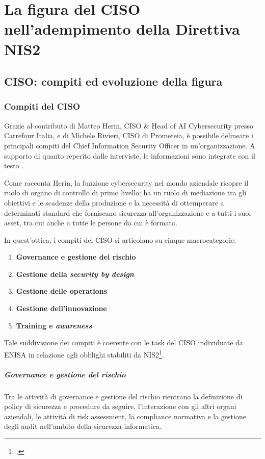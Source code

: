 \chapter{La figura del CISO nell'adempimento della Direttiva NIS2}
\label{cap:ciso}

\section{CISO: compiti ed evoluzione della figura}

\subsection{Compiti del CISO}
Grazie al contributo di Matteo Herin, CISO \& Head of AI Cybersecurity presso Carrefour
Italia, e di Michele Rivieri, CISO di Prometeia, è possibile delineare i principali 
compiti del Chief Information Security Officer in un'organizzazione. A supporto di quanto
reperito dalle interviste, le informazioni sono integrate con il testo \cite{kouns-ciso}.

Come racconta Herin, la funzione cybersecurity nel mondo aziendale ricopre il ruolo
di organo di controllo di primo livello: ha un ruolo di mediazione tra gli obiettivi e 
le scadenze della produzione e la necessità di ottemperare a determinati standard che forniscano
sicurezza all'organizzazione e a tutti i suoi asset, tra cui anche a tutte le persone da
cui è formata.

In quest'ottica, i compiti del CISO si articolano su cinque macrocategorie:
\begin{enumerate}
    \item \textbf{Governance e gestione del rischio}
    \item \textbf{Gestione della \textit{security by design}}
    \item \textbf{Gestione delle operations}
    \item \textbf{Gestione dell'innovazione}
    \item \textbf{Training e \textit{awareness}}
\end{enumerate}
Tale suddivisione dei compiti è coerente con le task del CISO individuate da ENISA in relazione
agli obblighi stabiliti da NIS2\footcite[p. 23]{enisa-cybersecurity-roles}.

\paragraph{Governance e gestione del rischio}
Tra le attività di governance e gestione del rischio rientrano la definizione di
policy di sicurezza e procedure da seguire, l'interazione con gli altri organi aziendali,
le attività di risk assessment, la compliance normativa e la gestione degli audit
nell'ambito della sicurezza informatica.

